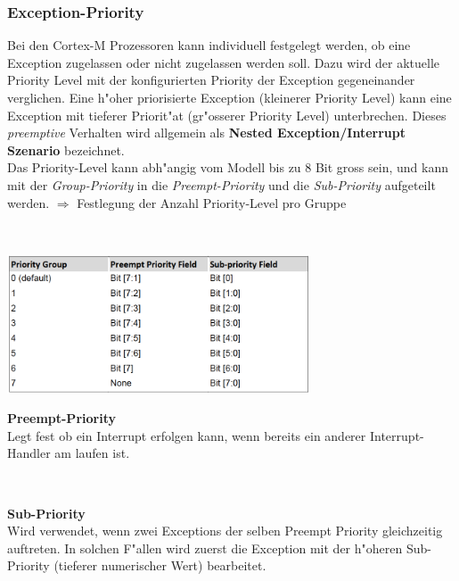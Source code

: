 \subsubsection{Exception-Priority}
\begin{minipage}{9cm}
	Bei den Cortex-M Prozessoren kann individuell festgelegt werden, ob eine Exception zugelassen oder nicht zugelassen werden soll. Dazu wird der aktuelle Priority Level mit der konfigurierten Priority der Exception gegeneinander verglichen. Eine h"oher priorisierte Exception (kleinerer Priority Level) kann eine Exception mit tieferer Priorit"at (gr"osserer Priority Level) unterbrechen. Dieses \textit{preemptive} Verhalten
	wird allgemein als \textbf{Nested Exception/Interrupt Szenario} bezeichnet.\\

Das Priority-Level kann abh"angig vom Modell bis zu 8 Bit gross sein, und kann mit der \textit{Group-Priority} in die \textit{Preempt-Priority} und die \textit{Sub-Priority} aufgeteilt werden. $\Rightarrow$ Festlegung der Anzahl Priority-Level pro Gruppe
\end{minipage}
%
\begin{minipage}{0.5cm}
	\-\
\end{minipage}
%
\begin{minipage}{9cm}
	\includegraphics[width=9cm]{images/group-priority}
\end{minipage}


\vspace{10pt}
\begin{minipage}[t]{9cm}
	\textbf{Preempt-Priority}\\
	Legt fest ob ein Interrupt erfolgen kann, wenn bereits ein anderer Interrupt-Handler am laufen ist.
\end{minipage}
%
\begin{minipage}[t]{0.5cm}
	\-\
\end{minipage}
%
\begin{minipage}[t]{9cm}
	\textbf{Sub-Priority}\\
	Wird verwendet, wenn zwei Exceptions der selben Preempt Priority gleichzeitig auftreten. In solchen F"allen wird zuerst die Exception mit der h"oheren Sub-Priority (tieferer numerischer Wert) bearbeitet.
\end{minipage}

